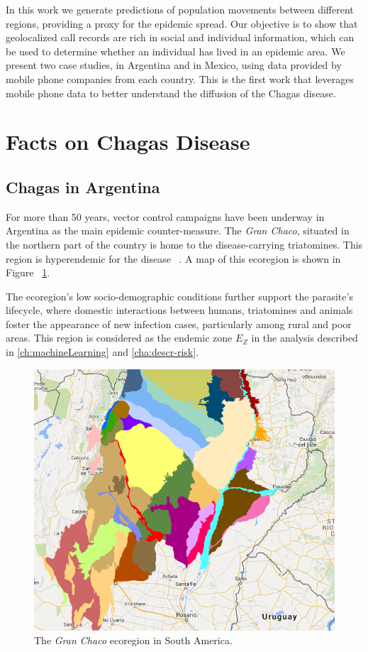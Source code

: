  In this work we generate predictions of population movements between different regions, providing a proxy for the epidemic spread. Our objective is to show that geolocalized call records are rich in social and individual information, which can be used to determine whether an individual has lived in an epidemic area. We present two case studies, in Argentina and in Mexico, using data provided by mobile phone companies from each country. %
This is the first work that leverages mobile phone data to better understand the diffusion of the Chagas disease.




\section{Facts on Chagas Disease}

\subsection{Chagas in  Argentina}\label{endemic_zone_argentina}

For more than 50 years, vector control campaigns have been underway in Argentina as the main epidemic counter-measure. The \textit{Gran Chaco}, situated in the northern part of the country is home to the disease-carrying triatomines. This region is hyperendemic for the disease~ \textcite{OPS2014mapa}. A map of this ecoregion is shown in Figure~ \cref{fig:granchaco}.

The ecoregion's low socio-demographic conditions further support the parasite's lifecycle, where domestic interactions between humans, triatomines and animals foster the appearance of new infection cases, particularly among rural and poor areas.
This region is considered as the endemic zone $E_Z$ in the analysis described in \cref{ch:machineLearning} and \cref{cha:descr-risk}.

\begin{figure}[h!]
\centering
\includegraphics[width=0.75\columnwidth]{figures/Ambientes_GranChaco_TNC-Argentina/Ambientes_GranChaco_TNC-Argentina.png}
\caption{The \textit{Gran Chaco} ecoregion in South America.%
}
\label{fig:granchaco}
\end{figure}


